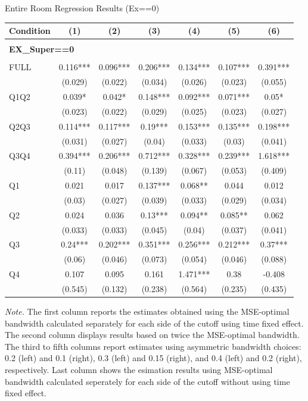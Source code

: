 \begin{table}[]
\TABLE
{Entire Room Regression Results (Ex==0) \label{result_detail2}}{\begin{tabular}{lcccccc}
\hline
Condition & (1) & (2) & (3) & (4) & (5) & (6) \\ \hline
\\ 
\multicolumn{5}{l}{\textbf{EX\_Super==0}} \\ 
\\ 
FULL & 0.116*** & 0.096*** & 0.206*** & 0.134*** & 0.107*** & 0.391*** \\ 
&(0.029)&(0.022) & (0.034)&(0.026)&(0.023)&(0.055)\\ 
Q1Q2 & 0.039* & 0.042* & 0.148*** & 0.092*** & 0.071*** & 0.05* \\ 
&(0.023)&(0.022) & (0.029)&(0.025)&(0.023)&(0.027)\\ 
Q2Q3 & 0.114*** & 0.117*** & 0.19*** & 0.153*** & 0.135*** & 0.198*** \\ 
&(0.031)&(0.027) & (0.04)&(0.033)&(0.03)&(0.041)\\ 
Q3Q4 & 0.394*** & 0.206*** & 0.712*** & 0.328*** & 0.239*** & 1.618*** \\ 
&(0.11)&(0.048) & (0.139)&(0.067)&(0.053)&(0.409)\\ 
Q1 & 0.021 & 0.017 & 0.137*** & 0.068** & 0.044 & 0.012 \\ 
&(0.03)&(0.027) & (0.039)&(0.033)&(0.029)&(0.034)\\ 
Q2 & 0.024 & 0.036 & 0.13*** & 0.094** & 0.085** & 0.062 \\ 
&(0.033)&(0.033) & (0.045)&(0.04)&(0.037)&(0.041)\\ 
Q3 & 0.24*** & 0.202*** & 0.351*** & 0.256*** & 0.212*** & 0.37*** \\ 
&(0.06)&(0.046) & (0.073)&(0.054)&(0.046)&(0.088)\\ 
Q4 & 0.107 & 0.095 & 0.161 & 1.471*** & 0.38 & -0.408 \\ 
&(0.545)&(0.132) & (0.238)&(0.564)&(0.235)&(0.435)\\ 
\hline 
 \end{tabular}}{\textit{Note.} The first column reports the estimates obtained using the MSE-optimal bandwidth calculated separately for each side of the cutoff using time fixed effect. The second column displays results based on twice the MSE-optimal bandwidth. The third to fifth columns report estimates using asymmetric bandwidth choices: 0.2 (left) and 0.1 (right), 0.3 (left) and 0.15 (right), and 0.4 (left) and 0.2 (right), respectively. Last column shows the esimation results using MSE-optimal bandwidth calculated seperately for each side of the cutoff without using time fixed effect.}
\end{table}
